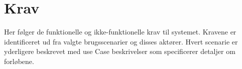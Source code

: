 \chapter{Krav}
Her følger de funktionelle og ikke-funktionelle krav til systemet. Kravene er identificeret ud fra valgte brugsscenarier og disses aktører. Hvert scenarie er yderligere beskrevet med use Case beskrivelser som specificerer detaljer om forløbene.








